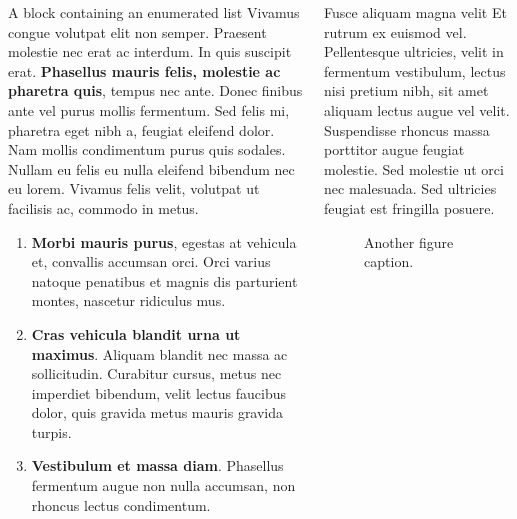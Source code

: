\documentclass{beamer}
\begin{document}
\begin{frame}[t]
\begin{columns}[t]
    \column{0.3\paperwidth}
    \begin{block}{A block containing an enumerated list}
      Vivamus congue volutpat elit non semper. Praesent molestie nec erat ac
      interdum. In quis suscipit erat. \textbf{Phasellus mauris felis, molestie
        ac pharetra quis}, tempus nec ante. Donec finibus ante vel purus mollis
      fermentum. Sed felis mi, pharetra eget nibh a, feugiat eleifend dolor. Nam
      mollis condimentum purus quis sodales. Nullam eu felis eu nulla eleifend
      bibendum nec eu lorem. Vivamus felis velit, volutpat ut facilisis ac,
      commodo in metus.
      \begin{enumerate}
        \item \textbf{Morbi mauris purus}, egestas at vehicula et, convallis accumsan orci. Orci varius natoque penatibus et magnis dis parturient montes, nascetur ridiculus mus.
        \item \textbf{Cras vehicula blandit urna ut maximus}. Aliquam blandit nec massa ac sollicitudin. Curabitur cursus, metus nec imperdiet bibendum, velit lectus faucibus dolor, quis gravida metus mauris gravida turpis.
        \item \textbf{Vestibulum et massa diam}. Phasellus fermentum augue non nulla accumsan, non rhoncus lectus condimentum.
      \end{enumerate}
    \end{block}

    \begin{block}{Fusce aliquam magna velit}
      Et rutrum ex euismod vel. Pellentesque ultricies, velit in fermentum
      vestibulum, lectus nisi pretium nibh, sit amet aliquam lectus augue vel
      velit. Suspendisse rhoncus massa porttitor augue feugiat molestie. Sed
      molestie ut orci nec malesuada. Sed ultricies feugiat est fringilla
      posuere.
      \begin{figure}
        \centering
        \caption{Another figure caption.}
      \end{figure}
    \end{block}


\end{columns}
\end{frame}
\end{document}
